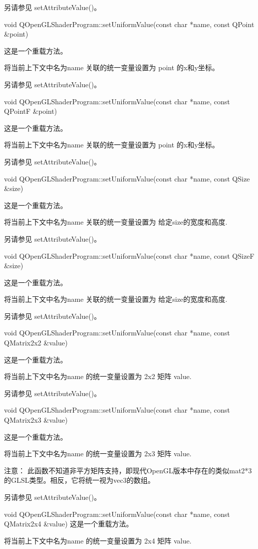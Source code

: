 另请参见 setAttributeValue()。

void QOpenGLShaderProgram::setUniformValue(const char *name, const QPoint \&point)

这是一个重载方法。

将当前上下文中名为name 关联的统一变量设置为 point 的x和y坐标。

另请参见 setAttributeValue()。

void QOpenGLShaderProgram::setUniformValue(const char *name, const QPointF \&point)

这是一个重载方法。

将当前上下文中名为name 关联的统一变量设置为 point 的x和y坐标。

另请参见 setAttributeValue()。

void QOpenGLShaderProgram::setUniformValue(const char *name, const QSize \&size)

这是一个重载方法。

将当前上下文中名为name 关联的统一变量设置为 给定size的宽度和高度.

另请参见 setAttributeValue()。

void QOpenGLShaderProgram::setUniformValue(const char *name, const QSizeF \&size)

这是一个重载方法。

将当前上下文中名为name 关联的统一变量设置为 给定size的宽度和高度.

另请参见 setAttributeValue()。

void QOpenGLShaderProgram::setUniformValue(const char *name, const QMatrix2x2 \&value)

这是一个重载方法。

将当前上下文中名为name 的统一变量设置为 2x2 矩阵 value.

另请参见 setAttributeValue()。

void QOpenGLShaderProgram::setUniformValue(const char *name, const QMatrix2x3 \&value)

这是一个重载方法。

将当前上下文中名为name 的统一变量设置为 2x3 矩阵 value.

注意： 此函数不知道非平方矩阵支持，即现代OpenGL版本中存在的类似mat2*3的GLSL类型。相反，它将统一视为vec3的数组。

另请参见 setAttributeValue()。

void QOpenGLShaderProgram::setUniformValue(const char *name, const QMatrix2x4 \&value)
这是一个重载方法。

将当前上下文中名为name 的统一变量设置为 2x4 矩阵 value.

